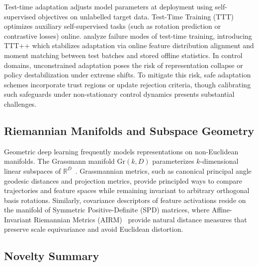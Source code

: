 Test-time adaptation adjusts model parameters at deployment using self-supervised objectives on unlabelled target data.
Test-Time Training (TTT)~\citep{sun2020ttt} optimizes auxiliary self-supervised tasks (such as rotation prediction or contrastive losses) online.
\citet{liu2021tttplusplus} analyze failure modes of test-time training, introducing TTT++ which stabilizes adaptation via online feature distribution alignment and moment matching between test batches and stored offline statistics.
In control domains, unconstrained adaptation poses the risk of representation collapse or policy destabilization under extreme shifts.
To mitigate this risk, safe adaptation schemes incorporate trust regions or update rejection criteria, though calibrating such safeguards under non-stationary control dynamics presents substantial challenges.

\subsection{Riemannian Manifolds and Subspace Geometry}

Geometric deep learning frequently models representations on non-Euclidean manifolds. 
The Grassmann manifold $\mathrm{Gr}(k, D)$ parameterizes $k$-dimensional linear subspaces of $\mathbb{R}^D$~\citep{bendokat2020grassmann,huang2016riemannian}.
Grassmannian metrics, such as canonical principal angle geodesic distances and projection metrics, provide principled ways to compare trajectories and feature spaces while remaining invariant to arbitrary orthogonal basis rotations.
Similarly, covariance descriptors of feature activations reside on the manifold of Symmetric Positive-Definite (SPD) matrices, where Affine-Invariant Riemannian Metrics (AIRM)~\citep{moakher2005differential} provide natural distance measures that preserve scale equivariance and avoid Euclidean distortion.

\subsection{Novelty Summary}


